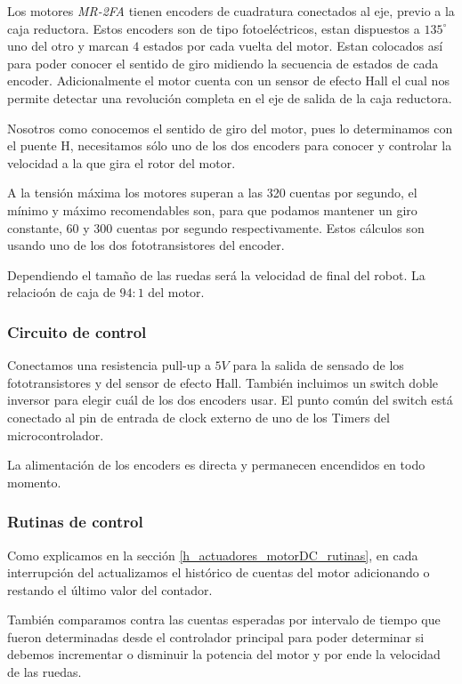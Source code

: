 Los motores \emph{MR-2FA} tienen encoders de cuadratura conectados al eje, previo a la caja reductora.
Estos encoders son de tipo fotoel\'ectricos, estan dispuestos a $135^{\circ}$ uno del otro y marcan $4$ estados por
cada vuelta del motor.
Estan colocados as\'i para poder conocer el sentido de giro midiendo la secuencia de estados de cada encoder.
Adicionalmente el motor cuenta con un sensor de efecto Hall el cual nos permite detectar una revoluci\'on completa
en el eje de salida de la caja reductora.

Nosotros como conocemos el sentido de giro del motor, pues lo determinamos con el puente H, necesitamos s\'olo
uno de los dos encoders para conocer y controlar la velocidad a la que gira el rotor del motor.

A la tensi\'on m\'axima los motores superan a las 320 cuentas por segundo, el m\'inimo y m\'aximo recomendables
son, para que podamos mantener un giro constante, $60$ y $300$ cuentas por segundo respectivamente.
Estos c\'alculos son usando uno de los dos fototransistores del encoder.

Dependiendo el tama\~no de las ruedas ser\'a la velocidad de final del robot.
La relacio\'on de caja de $94:1$ del motor.

\subsubsection{Circuito de control}
\label{h_sensado_encoder_circuito}

Conectamos una resistencia pull-up a $5V$ para la salida de sensado de los fototransistores y del sensor de efecto
Hall.
Tambi\'en incluimos un switch doble inversor para elegir cu\'al de los dos encoders usar.
El punto com\'un del switch est\'a conectado al pin de entrada de clock externo de uno de los Timers del
microcontrolador.

La alimentaci\'on de los encoders es directa y permanecen encendidos en todo momento.

\subsubsection{Rutinas de control}
\label{h_sensado_encoder_rutinas}

Como explicamos en la secci\'on \ref{h_actuadores_motorDC_rutinas}, en cada interrupci\'on del actualizamos
el hist\'orico de cuentas del motor adicionando o restando el \'ultimo valor del contador.

Tambi\'en comparamos contra las cuentas esperadas por intervalo de tiempo que fueron determinadas desde el controlador
principal para poder determinar si debemos incrementar o disminuir la potencia del motor y por ende la velocidad de las ruedas.

